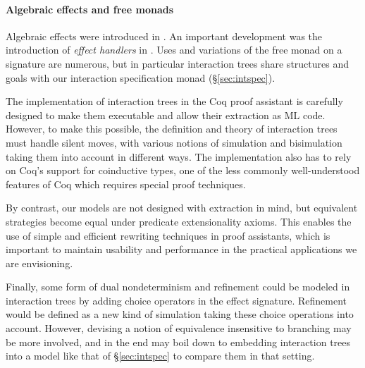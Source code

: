 \documentclass[sigplan,screen]{acmart}
\begin{document}
\paragraph{Algebraic effects and free monads}

Algebraic effects were introduced in \cite{effadq}.
An important development was
the introduction of \emph{effect handlers} in \cite{eff}.
Uses and variations of the free monad
on a signature are numerous,
but in particular
interaction trees \cite{itree}
share structures and goals with
our interaction specification monad (\S\ref{sec:intspec}).

The implementation of interaction trees in the Coq proof
assistant is carefully designed to make them executable and
allow their extraction as ML code.
However, to make this possible,
the definition and theory of interaction trees
must handle silent moves,
with various notions of simulation and bisimulation
taking them into account in different ways.
The implementation also has to rely on
Coq's support for coinductive types, one of the less
commonly well-understood features of Coq which requires
special proof techniques.

By contrast, our models are not designed with extraction in mind,
but equivalent strategies become equal under
predicate extensionality axioms. This enables
the use of simple and efficient rewriting techniques
in proof assistants,
which is important to maintain usability and performance
in the practical applications we are envisioning.

Finally,
some form of dual nondeterminism and refinement could be modeled
in interaction trees by adding choice operators in the effect
signature. Refinement would be defined as a new kind
of simulation taking these choice operations into account.
However, devising a notion of equivalence insensitive to
branching may be more involved, and in the end may boil down to
embedding interaction trees into a model like that of
\S\ref{sec:intspec} to
compare them in that setting.




\end{document}
